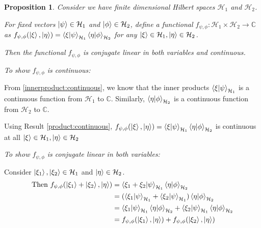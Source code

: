 \documentclass[12pt,twoside,fleqn]{report}
\makeatletter
\theoremstyle{thmstyle}
\renewenvironment{proof}[1][\proofname]{\par
\pushQED{\qed}%
\normalfont \topsep6\p@\@plus6\p@\relax
\trivlist
\item[\hskip\labelsep\itshape#1\@addpunct{.}]\mbox{}\par\nobreak\ignorespaces
}{%
    \popQED\endtrivlist\@endpefalse
    }
\newtheorem{prop}{Proposition}[chapter]
\makeatother
\begin{document}
\begin{prop}
    Consider we have finite dimensional Hilbert spaces $\mathcal{H}_1$ and $\mathcal{H}_2$.

    For fixed vectors $\ket{\psi} \in \mathcal{H}_1$ and $\ket{\phi} \in \mathcal{H}_2$, define a functional $f_{\psi,\phi}: \mathcal{H}_1 \times \mathcal{H}_2 \to \mathbb{C}$ as $f_{\psi,\phi}(\ket\xi, \ket\eta) = \braket{\xi|\psi}_{\mathcal{H}_1} \braket{\eta | \phi}_{\mathcal{H}_2}$ for any $\ket{\xi} \in \mathcal{H}_1, \ket{\eta} \in \mathcal{H}_2$.

    Then the functional $f_{\psi,\phi}$ is conjugate linear in both variables and continuous.
\end{prop}
\begin{proof}
    \emph{To show $f_{\psi, \phi}$ is continuous:}

    From \ref{innerproduct:continuous}, we know that the inner products $\braket{\xi|\psi}_{\mathcal{H}_1}$ is a continuous function from $\mathcal{H}_1$ to $\mathbb{C}$.
    Similarly, $\braket{\eta|\phi}_{\mathcal{H}_2}$ is a continuous function from $\mathcal{H}_2$ to $\mathbb{C}$.


    Using Result \ref{product:continuous}, $f_{\psi, \phi}(\ket\xi, \ket\eta) = \braket{\xi | \psi}_{\mathcal{H}_1} \braket{\eta|\phi}_{\mathcal{H}_2}$ is continuous at all $\ket\xi \in \mathcal{H}_1, \ket{\eta} \in \mathcal{H}_2$

    \emph{To show $f_{\psi, \phi}$ is conjugate linear in both variables:}

    Consider $\ket{\xi_1}, \ket{\xi_2} \in \mathcal{H}_1$ and $\ket{\eta} \in \mathcal{H}_2$.
    \begin{align*}
        \text{Then }f_{\psi,\phi}(\ket{\xi_1} + \ket{\xi_2}, \ket{\eta}) & = \braket{\xi_1 + \xi_2 | \psi}_{\mathcal{H}_1} \braket{\eta | \phi}_{\mathcal{H}_2}
        \\ & = (\braket{\xi_1 | \psi}_{\mathcal{H}_1}+ \braket{\xi_2 | \psi}_{\mathcal{H}_1}) \braket{\eta|\phi}_{\mathcal{H}_2}
        \\ & = \braket{\xi_1| \psi}_{\mathcal{H}_1}\braket{\eta|\phi}_{\mathcal{H}_2} + \braket{\xi_2|\psi}_{\mathcal{H}_1}\braket{\eta|\phi}_{\mathcal{H}_2}
        \\ & = f_{\psi,\phi}(\ket{\xi_1}, \ket{\eta}) + f_{\psi,\phi}(\ket{\xi_2},\ket{\eta})
    \end{align*}


\end{proof}
\end{document}
